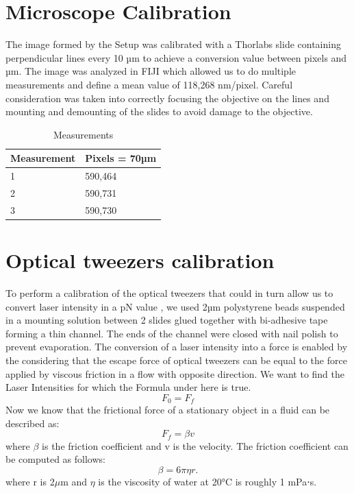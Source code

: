 \documentclass[a4paper,english,12pt,bibliography=totoc]{scrreprt}
\begin{document}
\section{Microscope Calibration}
The image formed by the Setup was calibrated with a Thorlabs slide containing perpendicular lines every 10 µm \cite{noauthor_thorlabs_nodate} to achieve a conversion value between pixels and µm.
The image was analyzed in FIJI \cite{schindelin_j_arganda-carreras_i_frise_e_kaynig_v_longair_m_pietzsch_t__cardona_a_fiji_2012} which allowed us to do multiple measurements and define a mean value of 118,268 nm/pixel.
Careful consideration was taken into correctly focusing the objective on the lines and mounting and demounting of the slides to avoid damage to the objective.
\begin{table}[h]
\centering
\caption{Measurements}
\begin{tabular}{@{}ll@{}}
\toprule
Measurement & Pixels = 70µm \\ \midrule
1           & 590,464         \\
2           & 590,731         \\
3           & 590,730         \\ \bottomrule
\end{tabular}
\end{table}

\section{Optical tweezers calibration}

To perform a calibration of the optical tweezers that could in turn allow us to convert laser intensity in a pN value , we used 2µm polystyrene beads suspended in a mounting solution between 2 slides glued together with bi-adhesive tape forming a thin channel.
The ends of the channel were closed with nail polish to prevent evaporation.
The conversion of a laser intensity into a force is enabled by the considering that the escape force of optical tweezers can be equal to the force applied by viscous friction in a flow with opposite direction. We want to find the Laser Intensities for which the Formula under here is true.
\[
F_0 = F_f
\]
Now we know that the frictional force of a stationary object in a fluid can be described as:
\[
F_f =\beta v
\]
where $\beta$ is the friction coefficient and v is the velocity. The friction coefficient can be computed as follows: 
\[
\beta = 6\pi\eta r.
\]
where r is 2$\mu$m  and $\eta$ is the viscosity of water at 20°C is  roughly 1 mPa⋅s.
\end{document}
